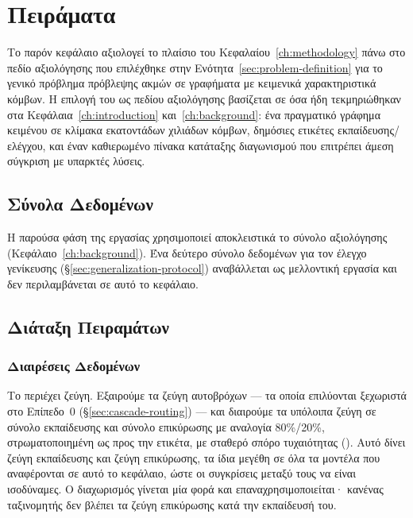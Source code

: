 

\chapter{Πειράματα}
\label{ch:experiments}

Το παρόν κεφάλαιο αξιολογεί το πλαίσιο  του Κεφαλαίου~\ref{ch:methodology}
πάνω στο πεδίο αξιολόγησης που επιλέχθηκε στην Ενότητα~\ref{sec:problem-definition}
για το γενικό πρόβλημα πρόβλεψης ακμών σε γραφήματα με κειμενικά χαρακτηριστικά
κόμβων.
Η επιλογή του  ως πεδίου αξιολόγησης βασίζεται σε
όσα ήδη τεκμηριώθηκαν στα Κεφάλαια~\ref{ch:introduction} και~\ref{ch:background}: ένα
πραγματικό γράφημα κειμένου σε κλίμακα εκατοντάδων χιλιάδων κόμβων, δημόσιες
ετικέτες εκπαίδευσης/ελέγχου, και έναν καθιερωμένο πίνακα κατάταξης διαγωνισμού που
επιτρέπει άμεση σύγκριση με υπαρκτές λύσεις.


\section{Σύνολα Δεδομένων}
\label{sec:datasets}

Η παρούσα φάση της εργασίας χρησιμοποιεί αποκλειστικά το σύνολο αξιολόγησης
 (Κεφάλαιο~\ref{ch:background}).
Ένα δεύτερο σύνολο
δεδομένων  για τον έλεγχο γενίκευσης (\S\ref{sec:generalization-protocol})
αναβάλλεται ως μελλοντική εργασία και δεν περιλαμβάνεται σε αυτό το κεφάλαιο.


\section{Διάταξη Πειραμάτων}
\label{sec:experimental-setup}

\subsection{Διαιρέσεις Δεδομένων}
\label{subsec:data-splits}

Το \texttt{} περιέχει \TrainPairs{} ζεύγη.
Εξαιρούμε τα \SelfLoopsTrain{} ζεύγη
αυτοβρόχων --- τα οποία επιλύονται ξεχωριστά στο Επίπεδο~0 (\S\ref{sec:cascade-routing})
--- και διαιρούμε τα υπόλοιπα \TrainPairsNoSelf{} ζεύγη σε σύνολο εκπαίδευσης και σύνολο
επικύρωσης με αναλογία 80\%/20\%, στρωματοποιημένη ως προς την ετικέτα, με σταθερό
σπόρο τυχαιότητας (\texttt{}). Αυτό δίνει \TrainSplitSize{} ζεύγη
εκπαίδευσης και \ValSplitSize{} ζεύγη επικύρωσης, τα ίδια μεγέθη σε όλα τα μοντέλα που
αναφέρονται σε αυτό το κεφάλαιο, ώστε οι συγκρίσεις μεταξύ τους να είναι ισοδύναμες.
Ο διαχωρισμός γίνεται μία φορά και επαναχρησιμοποιείται· κανένας ταξινομητής δεν
βλέπει τα ζεύγη επικύρωσης κατά την εκπαίδευσή του.

